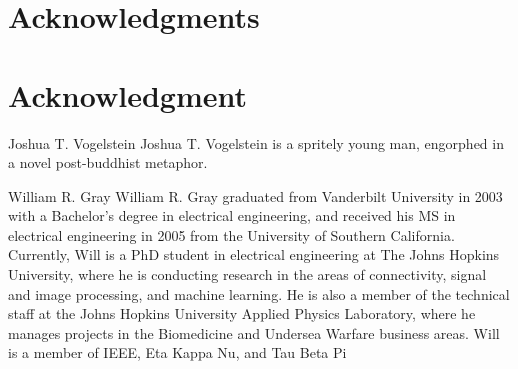 \documentclass[10pt,journal,cspaper,compsoc]{IEEEtran}
\begin{document}
% 

\ifCLASSOPTIONcompsoc
  \section*{Acknowledgments}
\else
  \section*{Acknowledgment}
\fi


\ifCLASSOPTIONcaptionsoff
  \newpage
\fi





\begin{IEEEbiography}{Joshua T. Vogelstein}
Joshua T. Vogelstein is a spritely young man, engorphed in a novel post-buddhist metaphor.

\end{IEEEbiography}

\begin{IEEEbiographynophoto}{William R. Gray}
William R. Gray graduated from Vanderbilt University in 2003 with a Bachelor’s degree in electrical engineering, and received his MS in electrical engineering in 2005 from the University of Southern California.  Currently, Will is a PhD student in electrical engineering at The Johns Hopkins University, where he is conducting research in the areas of connectivity, signal and image processing, and machine learning.  He is also a member of the technical staff at the Johns Hopkins University Applied Physics Laboratory, where he manages projects in the Biomedicine and Undersea Warfare business areas.  Will is a member of IEEE, Eta Kappa Nu, and Tau Beta Pi
\end{IEEEbiographynophoto}
\end{document}
